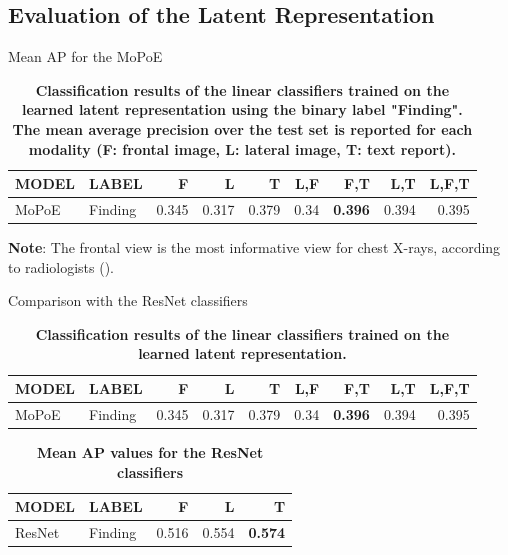     \subsection{Evaluation of the Latent Representation}

    \begin{frame}{Mean AP for the MoPoE}
            \begin{table}
            \centering
            \begin{tabular}{llrrrrrrr}
            MODEL & LABEL &      F &      L &      T &   L,F &    F,T &    L,T &  L,F,T \\
            \midrule
            MoPoE & Finding &  0.345 &  0.317 &  0.379 &  0.34 &  \textbf{0.396} &  0.394 &  0.395 \\

            \end{tabular}
            \caption{\textbf{Classification results of the linear classifiers trained on the learned latent representation using the binary label "Finding". The mean average precision over the test set
is reported for each modality (F: frontal image, L: lateral image, T: text report).}}
            \end{table}
    \pause
    \small{\textbf{Note}: The frontal view is the most informative view for chest X-rays, according to radiologists (\cite{kovaleva2020towards}).}
    \end{frame}

    \begin{frame}{Comparison with the ResNet classifiers}
            \begin{table}
                \centering
            \begin{tabular}{llrrrrrrr}
            MODEL & LABEL &      F &      L &      T &   L,F &    F,T &    L,T &  L,F,T \\
            \midrule
            MoPoE & Finding &  0.345 &  0.317 &  0.379 &  0.34 &  \textbf{0.396} &  0.394 &  0.395 \\

            \end{tabular}
            \caption{\textbf{Classification results of the linear classifiers trained on the learned latent representation.}}
            \end{table}

                        \begin{table}[]
                \centering
            \begin{tabular}{llrrr}
            MODEL & LABEL &      F &      L &      T       \\
            \midrule
            ResNet & Finding &  0.516 &  0.554 &  \textbf{0.574} \\
            \end{tabular}
            \caption{\textbf{Mean AP values for the ResNet classifiers}}
            \end{table}
    \end{frame}

